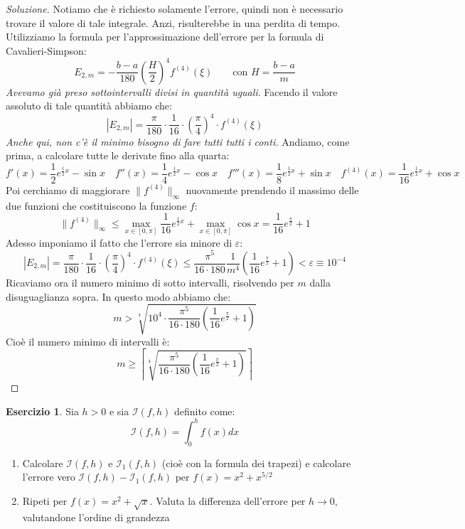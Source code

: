 \documentclass[11pt,a4paper,twoside]{article}
\newcommand{\vareps}{\varepsilon}
\theoremstyle{definition}
\newtheorem*{ese}{Esercizio}
\newenvironment{sol}
	{\renewcommand\qedsymbol{$\blacksquare$}\begin{proof}[Soluzione]}
	{\end{proof}}
\begin{document}
\begin{sol}
	Notiamo che è richiesto solamente l'errore, quindi non è necessario trovare il valore di tale integrale. Anzi, risulterebbe in una perdita di tempo. Utilizziamo la formula per l'approssimazione dell'errore per la formula di Cavalieri-Simpson:
	\[ E_{2,m} = -\frac{b-a}{180}\left(\frac H2\right)^4 f^{(4)} (\xi) \qquad \text{con }H = \frac{b-a}m\]
	\textit{Avevamo già preso sottointervalli divisi in quantità uguali}. Facendo il valore assoluto di tale quantità abbiamo che:
	\[ |E_{2,m}| = \frac \pi{180} \cdot \frac 1{16} \cdot \left(\frac \pi 4\right)^4 \cdot f^{(4)}(\xi)\]
	\textit{Anche qui, non c'è il minimo bisogno di fare tutti tutti i conti.}
	Andiamo, come prima, a calcolare tutte le derivate fino alla quarta:
	\[ f'(x) = \frac 12 e^{\frac 12 x} - \sin x \quad f''(x) = \frac 14 e^{\frac 12 x} - \cos x \quad f'''(x) = \frac 18 e^{\frac 12 x} + \sin x \quad f^{(4)}(x) = \frac 1{16} e^{\frac 12 x} + \cos x\]
	Poi cerchiamo di maggiorare $\|f^{(4)}\|_\infty$ nuovamente prendendo il massimo delle due funzioni che costituiscono la funzione $f$:
	\[ \|f^{(4)}\|_\infty \leq \max_{x \in [0,\pi]} \frac 1{16}e^{\frac 12 x} + \max_{x \in [0,\pi]} \cos x = \frac 1{16} e^{\frac \pi 2} + 1\]
	Adesso imponiamo il fatto che l'errore sia minore di $\vareps$:
	\[ |E_{2,m}| = \frac \pi{180} \cdot \frac 1{16} \cdot \left(\frac \pi 4\right)^4 \cdot f^{(4)}(\xi) \leq \frac{\pi^5}{16 \cdot 180} \frac{1}{m^4}\left( \frac 1{16}e^{\frac \pi 2} + 1 \right) < \vareps \equiv 10^{-4}\]
	Ricaviamo ora il numero minimo di sotto intervalli, risolvendo per $m$ dalla disuguaglianza sopra. In questo modo abbiamo che:
	\[ m> \sqrt[4]{10^4 \cdot \frac{\pi^5}{16 \cdot 180} \left( \frac 1{16} e^{\frac \pi 2} + 1 \right) } \]
	Cioè il numero minimo di intervalli è:
	\[ m \geq \left\lceil \sqrt[4]{\frac{\pi^5}{16 \cdot 180} \left( \frac 1{16} e^{\frac \pi 2} + 1 \right)} \right\rceil \]
\end{sol}

\begin{ese}
	Sia $h>0$ e sia $\mathcal I(f, h)$ definito come:
	\[ \mathcal I(f,h) = \int_0^h f(x)dx \]
	\begin{enumerate}
		\item Calcolare $\mathcal I(f,h)$ e $\mathcal I_1(f,h)$ (cioè con la formula dei trapezi) e calcolare l'errore vero $\mathcal I(f,h) - \mathcal I_1(f,h)$ per $f(x) = x^2 + x^{5/2}$
		\item Ripeti per $f(x) = x^2 + \sqrt x$. Valuta la differenza dell'errore per $h \to 0$, valutandone l'ordine di grandezza
	\end{enumerate}
\end{ese}
\end{document}

